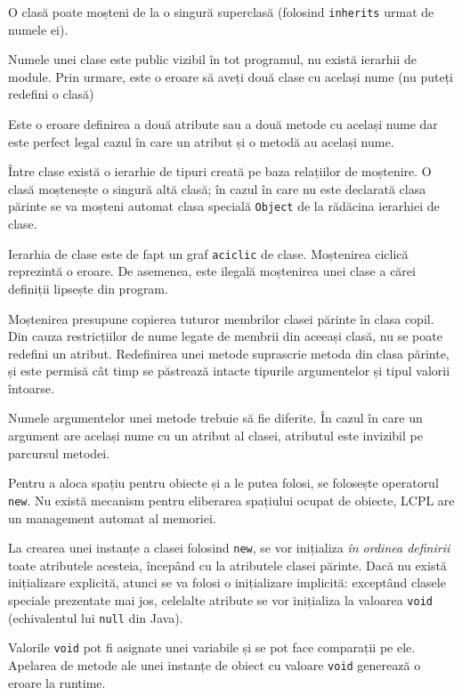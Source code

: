 \documentclass[12pt]{article}
\begin{document}
O clasă poate moșteni de la o singură superclasă (folosind \texttt{inherits} urmat de numele ei).

Numele unei clase este public vizibil în tot programul, nu există ierarhii de module. Prin urmare, este o eroare să aveți două clase cu același nume (nu puteți redefini o clasă)

Este o eroare definirea a două atribute sau a două metode cu același nume dar este perfect legal cazul în care un atribut și o metodă au același nume.

Între clase există o ierarhie de tipuri creată pe baza relațiilor de moștenire. O clasă moștenește o singură altă clasă; în cazul în care nu este declarată clasa părinte se va moșteni automat clasa specială \texttt{Object} de la rădăcina ierarhiei de clase.

Ierarhia de clase este de fapt un graf \texttt{aciclic} de clase. Moștenirea ciclică reprezintă o eroare. De asemenea, este ilegală moștenirea unei clase a cărei definiții lipsește din program.

Moștenirea presupune copierea tuturor membrilor clasei părinte în clasa copil. Din cauza restricțiilor de nume legate de membrii din aceeași clasă, nu se poate redefini un atribut. Redefinirea unei metode suprascrie metoda din clasa părinte, și este permisă cât timp se păstrează intacte tipurile argumentelor și tipul valorii întoarse.

Numele argumentelor unei metode trebuie să fie diferite. În cazul în care un argument are același nume cu un atribut al clasei, atributul este invizibil pe parcursul metodei.

Pentru a aloca spațiu pentru obiecte și a le putea folosi, se folosește operatorul \texttt{new}. Nu există mecanism pentru eliberarea spațiului ocupat de obiecte, LCPL are un management automat al memoriei.

La crearea unei instanțe a clasei folosind \texttt{new}, se vor inițializa \textit{în ordinea definirii} toate atributele acesteia, începând cu la atributele clasei părinte. Dacă nu există inițializare explicită, atunci se va folosi o inițializare implicită: exceptând clasele speciale prezentate mai jos, celelalte atribute se vor inițializa la valoarea \texttt{void} (echivalentul lui \texttt{null} din Java).

Valorile \texttt{void} pot fi asignate unei variabile și se pot face comparații pe ele. Apelarea de metode ale unei instanțe de obiect cu valoare \texttt{void} generează o eroare la runtime.
\end{document}
